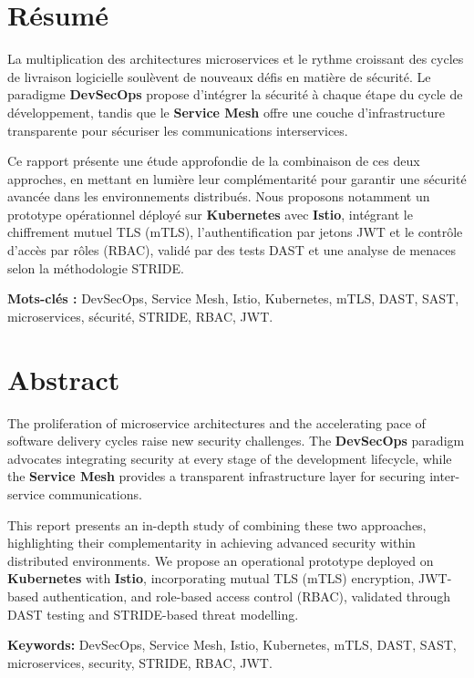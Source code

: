 \chapter*{Résumé}

La multiplication des architectures microservices et le rythme croissant des cycles
de livraison logicielle soulèvent de nouveaux défis en matière de sécurité.
Le paradigme \textbf{DevSecOps} propose d'intégrer la sécurité à chaque étape
du cycle de développement, tandis que le \textbf{Service Mesh} offre une couche
d'infrastructure transparente pour sécuriser les communications interservices.

Ce rapport présente une étude approfondie de la combinaison de ces deux approches,
en mettant en lumière leur complémentarité pour garantir une sécurité avancée dans
les environnements distribués. Nous proposons notamment un prototype opérationnel
déployé sur \textbf{Kubernetes} avec \textbf{Istio}, intégrant le chiffrement
mutuel TLS (mTLS), l'authentification par jetons JWT et le contrôle d'accès
par rôles (RBAC), validé par des tests DAST et une analyse de menaces selon
la méthodologie STRIDE.

\medskip
\noindent\textbf{Mots-clés :} DevSecOps, Service Mesh, Istio, Kubernetes,
mTLS, DAST, SAST, microservices, sécurité, STRIDE, RBAC, JWT.


\chapter*{Abstract}

The proliferation of microservice architectures and the accelerating pace of software
delivery cycles raise new security challenges. The \textbf{DevSecOps} paradigm advocates
integrating security at every stage of the development lifecycle, while the
\textbf{Service Mesh} provides a transparent infrastructure layer for securing
inter-service communications.

This report presents an in-depth study of combining these two approaches, highlighting
their complementarity in achieving advanced security within distributed environments.
We propose an operational prototype deployed on \textbf{Kubernetes} with \textbf{Istio},
incorporating mutual TLS (mTLS) encryption, JWT-based authentication, and
role-based access control (RBAC), validated through DAST testing and STRIDE-based
threat modelling.

\medskip
\noindent\textbf{Keywords:} DevSecOps, Service Mesh, Istio, Kubernetes,
mTLS, DAST, SAST, microservices, security, STRIDE, RBAC, JWT.
